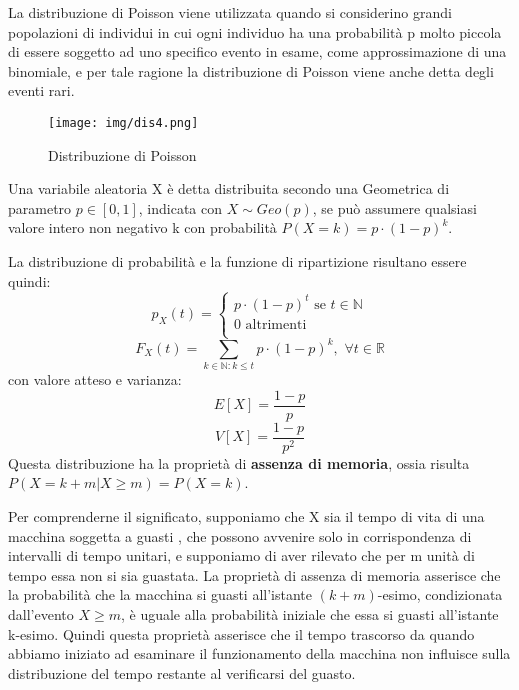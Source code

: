 \documentclass[a4paper,12pt, oneside]{book}
\newcommand{\numberset}{\mathbb}
\newcommand{\N}{\numberset{N}}
\newcommand{\R}{\numberset{R}}
\begin{document}
La distribuzione di Poisson viene utilizzata quando si considerino grandi popolazioni di individui in cui 
ogni individuo ha una probabilità p molto piccola di essere soggetto ad uno specifico evento in esame, come
approssimazione di una binomiale, e per tale ragione la distribuzione di Poisson viene anche detta degli eventi rari.
\begin{figure}
    \caption{Distribuzione di Poisson}
    \label{fig:poisson}
	\texttt{[image: img/dis4.png]}
\end{figure}

Una variabile aleatoria X è detta distribuita secondo una Geometrica di parametro $p\in[0,1]$, indicata con $X \sim Geo(p)$,
se può assumere qualsiasi valore intero non negativo k con probabilità $P(X = k) = p \cdot (1-p)^k$.

La distribuzione di probabilità e la funzione di ripartizione risultano essere quindi:
\[p_X(t) = \begin{cases}
            p \cdot (1-p)^t \mbox{ se } t \in \N\\
            0               \mbox{ altrimenti}\\
           \end{cases}\]
\[F_X(t) = \sum_{k \in \N:k \leq t} p \cdot (1-p)^k,\,\,\forall t \in \R\]
con valore atteso e varianza:
\[E[X] = \frac{1-p}{p}\]
\[V[X] = \frac{1-p}{p^2}\]
Questa distribuzione ha la proprietà di \textbf{assenza di memoria}, ossia risulta $P(X = k + m | X \geq m) = P(X = k)$. 

Per comprenderne il significato, supponiamo che X sia il tempo di vita di una macchina soggetta a guasti
, che possono avvenire solo in corrispondenza di intervalli di tempo unitari, e supponiamo di aver rilevato
che per m unità di tempo essa non si sia guastata.\newline
La proprietà di assenza di memoria asserisce che la probabilità che la macchina si guasti all'istante $(k+m)$-esimo,
condizionata dall'evento $X \geq m$, è uguale alla probabilità iniziale che essa si guasti all'istante k-esimo.\newline
Quindi questa proprietà asserisce che il tempo trascorso da quando abbiamo iniziato ad esaminare il funzionamento
della macchina non influisce sulla distribuzione del tempo restante al verificarsi del guasto.
\end{document}
